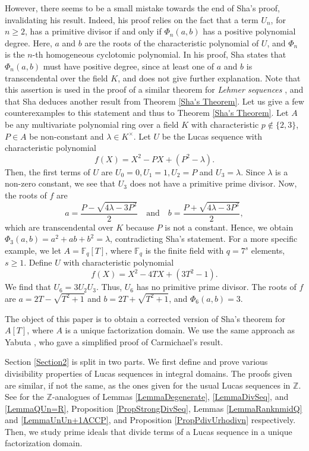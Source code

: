 \documentclass[reqno]{amsart}
\begin{document}
However, there seems to be a small mistake towards the end of Sha's proof, invalidating his result. Indeed, his proof relies on the fact that a term $U_n$, for $n\geq 2$, has a primitive divisor if and only if $\Phi_n(a,b)$ has a positive polynomial degree. Here, $a$ and $b$ are the roots of the characteristic polynomial of $U$, and $\Phi_n$ is the $n$-th homogeneous cyclotomic polynomial. In his proof, Sha states that $\Phi_n(a,b)$ must have positive degree, since at least one of $a$ and $b$ is transcendental over the field $K$, and does not give further explanation. Note that this assertion is used in the proof of a similar theorem for {\it Lehmer sequences} \cite[Theorem 1.2]{Sha}, and that Sha deduces another result \cite[Theorem 1.6]{Sha} from Theorem \ref{Sha's Theorem}. Let us give a few counterexamples to this statement and thus to Theorem \ref{Sha's Theorem}. Let $A$ be any multivariate polynomial ring over a field $K$ with characteristic $p\not \in \{2,3\}$, $P\in A$ be non-constant and $\lambda\in K^\times$. Let $U$ be the Lucas sequence with characteristic polynomial
\[
f(X) = X^2-PX+(P^2-\lambda).
\]
Then, the first terms of $U$ are $U_0=0, U_1=1, U_2=P$ and $U_3=\lambda$. Since $\lambda$ is a non-zero constant, we see that $U_3$ does not have a primitive prime divisor. Now, the roots of $f$ are
\[
a=\frac{P- \sqrt{4\lambda-3P^2}}{2} \quad \text{and} \quad b=\frac{P + \sqrt{4\lambda-3P^2}}{2},
\]
which are transcendental over $K$ because $P$ is not a constant. Hence, we obtain $\Phi_3(a,b) = a^2+ab+b^2 = \lambda$, contradicting Sha's statement. For a more specific example, we let $A=\mathbb{F}_q[T]$, where $\mathbb{F}_q$ is the finite field with $q=7^s$ elements, $s\geq 1$. Define $U$ with characteristic polynomial
\[
f(X) = X^2-4TX+(3T^2-1).
\]
We find that $U_6=3U_2U_3$. Thus, $U_6$ has no primitive prime divisor. The roots of $f$ are $a=2T-\sqrt{T^2+1}$ and $b=2T+\sqrt{T^2+1}$, and $\Phi_6(a,b) = 3$.

The object of this paper is to obtain a corrected version of Sha's theorem for $A[T]$, where $A$ is a unique factorization domain. We use the same approach as Yabuta \cite{Ya}, who gave a simplified proof of Carmichael's result.

Section \ref{Section2} is split in two parts. We first define and prove various divisibility properties of Lucas sequences in integral domains. The proofs given are similar, if not the same, as the ones given for the usual Lucas sequences in $\mathbb{Z}$. See \cite[Theorems 38 and 2, Lemma 2, Theorem 3, Lemmas 8 and 7, and Theorem 8]{BaWi} for the $\mathbb{Z}$-analogues of Lemmas \ref{LemmaDegenerate}, \ref{LemmaDivSeq}, and \ref{LemmaQUn=R}, Proposition \ref{PropStrongDivSeq}, Lemmas \ref{LemmaRanknmidQ} and \ref{LemmaUnUn+1ACCP}, and Proposition \ref{PropPdivUrhodivn} respectively. Then, we study prime ideals that divide terms of a Lucas sequence in a unique factorization domain.
\end{document}
